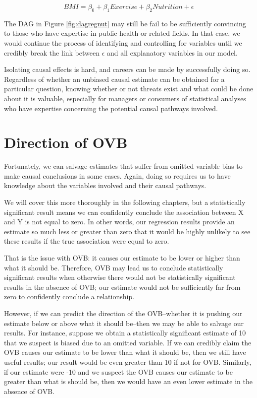 \documentclass[
]{book}
\begin{document}
\begin{equation}
BMI = \beta_0 + \beta_1Exercise + \beta_2Nutrition + \epsilon
\label{eq:dagreg2}
\end{equation}

The DAG in Figure \ref{fig:dagregnut} may still be fail to be sufficiently convincing to those who have expertise in public health or related fields. In that case, we would continue the process of identifying and controlling for variables until we credibly break the link between \(\epsilon\) and all explanatory variables in our model.

Isolating causal effects is hard, and careers can be made by successfully doing so. Regardless of whether an unbiased causal estimate can be obtained for a particular question, knowing whether or not threats exist and what could be done about it is valuable, especially for managers or consumers of statistical analyses who have expertise concerning the potential causal pathways involved.

\hypertarget{direction-of-ovb}{%
\section{Direction of OVB}\label{direction-of-ovb}}

Fortunately, we can salvage estimates that suffer from omitted variable bias to make causal conclusions in some cases. Again, doing so requires us to have knowledge about the variables involved and their causal pathways.

We will cover this more thoroughly in the following chapters, but a statistically significant result means we can confidently conclude the association between X and Y is not equal to zero. In other words, our regression results provide an estimate so much less or greater than zero that it would be highly unlikely to see these results if the true association were equal to zero.

That is the issue with OVB: it causes our estimate to be lower or higher than what it should be. Therefore, OVB may lead us to conclude statistically significant results when otherwise there would not be statistically significant results in the absence of OVB; our estimate would not be sufficiently far from zero to confidently conclude a relationship.

However, if we can predict the direction of the OVB--whether it is pushing our estimate below or above what it should be--then we may be able to salvage our results. For instance, suppose we obtain a statistically significant estimate of 10 that we suspect is biased due to an omitted variable. If we can credibly claim the OVB causes our estimate to be lower than what it should be, then we still have useful results; our result would be even greater than 10 if not for OVB. Similarly, if our estimate were -10 and we suspect the OVB causes our estimate to be greater than what is should be, then we would have an even lower estimate in the absence of OVB.
\end{document}
